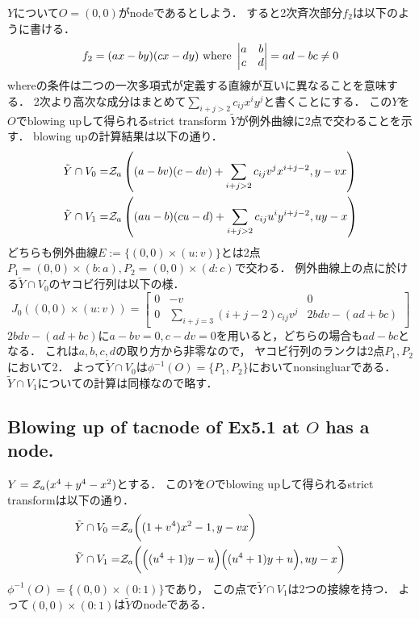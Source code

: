 \documentclass[a4paper]{jsarticle}
\begin{document}
    $Y$について$O=(0,0)$がnodeであるとしよう．
    すると2次斉次部分$f_2$は以下のように書ける．
    \[
        f_2=(ax-by)(cx-dy)
        \text{ where }
        \begin{vmatrix}
            a & b \\ c & d
        \end{vmatrix}
        =ad-bc
        \neq 0
    \]
    whereの条件は二つの一次多項式が定義する直線が互いに異なることを意味する．
    2次より高次な成分はまとめて$\sum_{i+j>2}{c_{ij} x^i y^j}$と書くことにする．
    この$Y$を$O$でblowing upして得られるstrict transform $\tilde{Y}$が例外曲線に2点で交わることを示す．
    blowing upの計算結果は以下の通り．
    \begin{align*}
        \tilde{Y} \cap V_0 =& \mathcal{Z}_a \left( (a-bv)(c-dv)+\sum_{i+j>2}{c_{ij} v^j x^{i+j-2}}, y-vx \right) \\
        \tilde{Y} \cap V_1 =& \mathcal{Z}_a \left( (au-b)(cu-d)+\sum_{i+j>2}{c_{ij} u^i y^{i+j-2}}, uy-x \right)
    \end{align*}
    どちらも例外曲線$E:=\{(0,0) \times (u:v) \}$とは2点$P_1=(0,0) \times (b:a), P_2=(0,0) \times (d:c)$で交わる．
    例外曲線上の点に於ける$\tilde{Y} \cap V_0$のヤコビ行列は以下の様．
    \[
        J_0((0,0) \times (u:v))=
        \begin{bmatrix}
            0 & -v & 0 \\
            0 & \sum_{i+j=3}{(i+j-2) c_{ij} v^j} & 2bdv-(ad+bc)
        \end{bmatrix}
    \]
    $2bdv-(ad+bc)$に$a-bv=0, c-dv=0$を用いると，どちらの場合も$ad-bc$となる．
    これは$a,b,c,d$の取り方から非零なので，
    ヤコビ行列のランクは2点$P_1, P_2$において2．
    よって$\tilde{Y} \cap V_0$は$\phi^{-1}(O)=\{P_1,P_2\}$においてnonsingluarである．
    $\tilde{Y} \cap V_1$についての計算は同様なので略す．

    \subsection{Blowing up of tacnode of Ex5.1 at $O$ has a node.}
    $Y=\mathcal{Z}_a(x^4+y^4-x^2)$とする．
    この$Y$を$O$でblowing upして得られるstrict transformは以下の通り．
    \begin{align*}
        \tilde{Y} \cap V_0 =& \mathcal{Z}_a \bigg( (1+v^4) x^2-1, y-vx \bigg) \\
        \tilde{Y} \cap V_1 =& \mathcal{Z}_a \bigg( \Big( (u^4+1) y-u \Big) \Big( (u^4+1) y+u \Big), uy-x \bigg)
    \end{align*}
    $\phi^{-1}(O)=\{(0,0) \times (0:1)\}$であり，
    この点で$\tilde{Y} \cap V_1$は2つの接線を持つ．
    よって$(0,0) \times (0:1)$は$\tilde{Y}$のnodeである．
\end{document}
